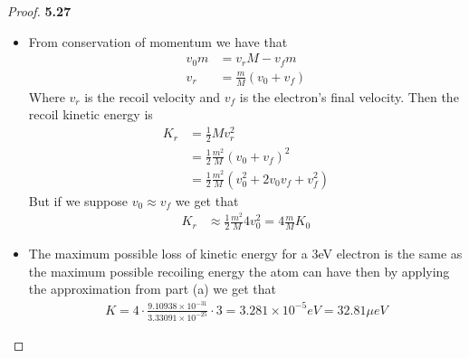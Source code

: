 \documentclass[11pt]{article}
\theoremstyle{definition}
\begin{document}
\begin{proof}{\textbf{5.27}}
\begin{itemize}
    \item [(a)] From conservation of momentum we have that
    \begin{align*}
        v_0m &= v_r M - v_f m\\
        v_r &= \frac{m}{M}(v_0 + v_f)
    \end{align*}
    Where $v_r$ is the recoil velocity and $v_f$ is the electron's final
    velocity. Then the recoil kinetic energy is 
    \begin{align*}
        K_r &= \frac{1}{2}Mv_r^2\\
        &=\frac{1}{2}\frac{m^2}{M}(v_0 + v_f)^2\\
        &=\frac{1}{2}\frac{m^2}{M}(v_0^2 + 2v_0v_f + v_f^2)
    \end{align*}
    But if we suppose $v_0 \approx v_f$ we get that
    \begin{align*}
        K_r &\approx\frac{1}{2}\frac{m^2}{M}4v_0^2 = 4\frac{m}{M}K_0
    \end{align*}
    \item [(b)] The maximum possible loss of kinetic energy for a 3eV electron
    is the same as the maximum possible recoiling energy the atom can have
    then by applying the approximation from part (a) we get that
    \begin{align*}
        K = 4\cdot\frac{9.10938\times 10^{-31}}{3.33091\times 10^{-25}} \cdot 3
        = 3.281 \times 10^{-5} eV = 32.81 \mu eV 
    \end{align*}
\end{itemize}
\end{proof}
\end{document}
